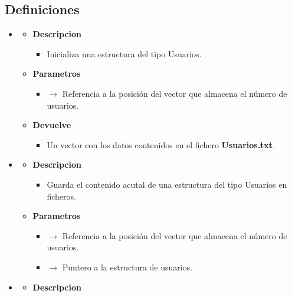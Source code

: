 \subsection{Definiciones}
\begin{itemize}
	\item {}
	\begin{itemize}
		\item \textbf{Descripcion}
        \begin{itemize}
			\item Inicializa una estructura del tipo Usuarios.
		\end{itemize}
        \item \textbf{Parametros}
		\begin{itemize}
			\item {} $\rightarrow$ Referencia a la posición del vector que almacena el número de usuarios.
		\end{itemize}
		\item \textbf{Devuelve}
		\begin{itemize}
			\item Un vector con los datos contenidos en el fichero \textbf{Usuarios.txt}.
		\end{itemize}
	\end{itemize}
    \newpage
	\item{}
	\begin{itemize}
		\item \textbf{Descripcion}
        \begin{itemize}
			\item Guarda el contenido acutal de una estructura del tipo Usuarios en ficheros.
		\end{itemize}
        \item \textbf{Parametros}
		\begin{itemize}
			\item {} $\rightarrow$ Referencia a la posición del vector que almacena el número de usuarios.
            \item {} $\rightarrow$ Puntero a la estructura de usuarios.
		\end{itemize}
	\end{itemize}
    \item{}
	\begin{itemize}
		\item \textbf{Descripcion}
        \begin{itemize}

\end{itemize}
\end{itemize}
\end{itemize}
